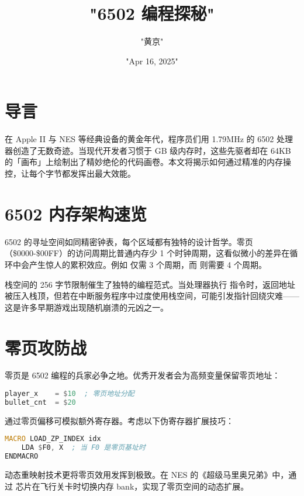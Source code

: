\title{"6502 编程探秘"}
\author{"黄京"}
\date{"Apr 16, 2025"}
\maketitle
\chapter{导言}
在 Apple II 与 NES 等经典设备的黄金年代，程序员们用 1.79MHz 的 6502 处理器创造了无数奇迹。当现代开发者习惯于 GB 级内存时，这些先驱者却在 64KB 的「画布」上绘制出了精妙绝伦的代码画卷。本文将揭示如何通过精准的内存操控，让每个字节都发挥出最大效能。\par
\chapter{6502 内存架构速览}
6502 的寻址空间如同精密钟表，每个区域都有独特的设计哲学。零页（\${}0000-\${}00FF）的访问周期比普通内存少 1 个时钟周期，这看似微小的差异在循环中会产生惊人的累积效应。例如  仅需 3 个周期，而  则需要 4 个周期。\par
栈空间的 256 字节限制催生了独特的编程范式。当处理器执行  指令时，返回地址被压入栈顶，但若在中断服务程序中过度使用栈空间，可能引发指针回绕灾难——这是许多早期游戏出现随机崩溃的元凶之一。\par
\chapter{零页攻防战}
零页是 6502 编程的兵家必争之地。优秀开发者会为高频变量保留零页地址：\par
\begin{lstlisting}[language=asm]
player_x    = $10  ; 零页地址分配
bullet_cnt  = $20
\end{lstlisting}
通过零页偏移可模拟额外寄存器。考虑以下伪寄存器扩展技巧：\par
\begin{lstlisting}[language=asm]
MACRO LOAD_ZP_INDEX idx
    LDA $F0, X  ; 当 F0 是零页基址时
ENDMACRO
\end{lstlisting}
动态重映射技术更将零页效用发挥到极致。在 NES 的《超级马里奥兄弟》中，通过  芯片在飞行关卡时切换内存 bank，实现了零页空间的动态扩展。\par

